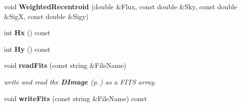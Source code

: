 \begin{CompactItemize}
\item 
{}
void {\bf Weighted\-Recentroid} (double \&Flux, const double \&Sky, const double \&Sig\-X, const double \&Sigy)\label{class_vignet_a10}

\item 
{}
int {\bf Hx} () const\label{class_vignet_a11}

\item 
{}
int {\bf Hy} () const\label{class_vignet_a12}

\item 
{}
void {\bf read\-Fits} (const string \&File\-Name)\label{class_vignet_a13}

\begin{CompactList}\small\item\em write and read the {\bf DImage} {\rm (p.\,\pageref{class_dimage})} as a FITS array.\item\end{CompactList}\item 
{}
void {\bf write\-Fits} (const string \&File\-Name) const\label{class_vignet_a14}

\end{CompactItemize}
